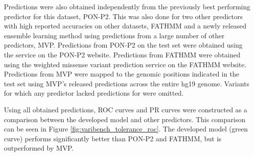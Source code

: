 \documentclass[11pt]{article}
\begin{document}
Predictions were also obtained independently from the previously best performing predictor for this dataset, PON-P2. This was also done for two other predictors with high reported accuracies on other datasets, FATHMM\cite{shihab2013predicting} and a newly released ensemble learning method using predictions from a large number of other predictors, MVP\cite{qi2018mvp}.
Predictions from PON-P2 on the test set were obtained using the service on the PON-P2 website\cite{PONP2server}. Predictions from FATHMM were obtained using the weighted missense variant prediction service on the FATHMM website\cite{FATHMMserver}. Predictions from MVP were mapped to the genomic positions indicated in the test set using MVP's released predictions across the entire hg19 genome. Variants for which any predictor lacked predictions for were omitted.

Using all obtained predictions, ROC curves and PR curves were constructed as a comparison between the developed model and other predictors. This comparison can be seen in Figure \ref{fig:varibench_tolerance_roc}. The developed model (green curve) performs significantly better than PON-P2 and FATHMM, but is outperformed by MVP.
\end{document}
